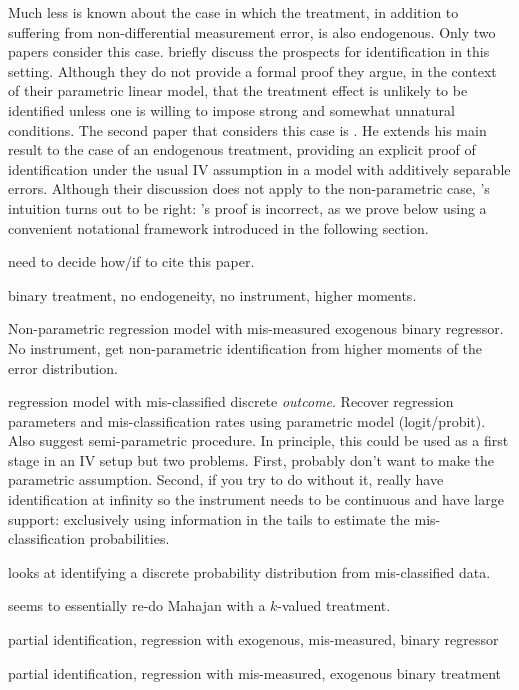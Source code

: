 Much less is known about the case in which the treatment, in addition to suffering from non-differential measurement error, is also endogenous.
Only two papers consider this case.
\cite{FL} briefly discuss the prospects for identification in this setting.
Although they do not provide a formal proof they argue, in the context of their parametric linear model, that the treatment effect is unlikely to be identified unless one is willing to impose strong and somewhat unnatural conditions. 
The second paper that considers this case is \cite{Mahajan}.
He extends his main result to the case of an endogenous treatment, providing an explicit proof of identification under the usual IV assumption in a model with additively separable errors.
Although their discussion does not apply to the non-parametric case, \citeauthor{FL}'s intuition turns out to be right: \citeauthor{Mahajan}'s proof is incorrect, as we prove below using a convenient notational framework introduced in the following section.


\cite{Card} need to decide how/if to cite this paper.

\cite{ChenHuLewbel} binary treatment, no endogeneity, no instrument, higher moments.

\cite{ChenHuLewbel2} Non-parametric regression model with mis-measured exogenous binary regressor. No instrument, get non-parametric identification from higher moments of the error distribution.

\cite{Hausman} regression model with mis-classified discrete \emph{outcome}. Recover regression parameters and mis-classification rates using parametric model (logit/probit). Also suggest semi-parametric procedure.
In principle, this could be used as a first stage in an IV setup but two problems.
First, probably don't want to make the parametric assumption.
Second, if you try to do without it, really have identification at infinity so the instrument needs to be continuous and have large support: exclusively using information in the tails to estimate the mis-classification probabilities.

\cite{molinari} looks at identifying a discrete probability distribution from mis-classified data.

\cite{hu2008} seems to essentially re-do Mahajan with a $k$-valued treatment.

\cite{Bollinger} partial identification, regression with exogenous, mis-measured, binary regressor

\cite{BollingerHasseltWP} partial identification, regression with mis-measured, exogenous binary treatment

